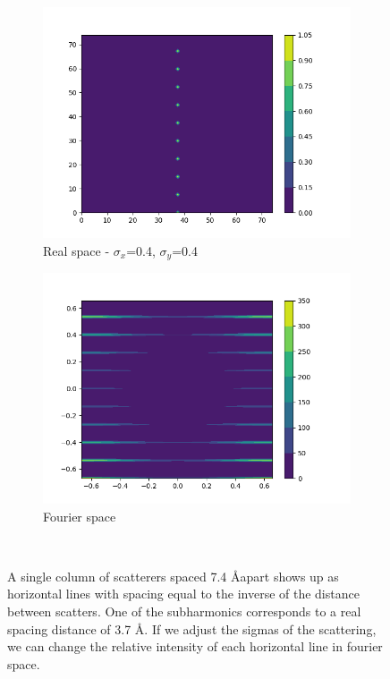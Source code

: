 \documentclass{article}
\begin{document}
\begin{figure}
\begin{subfigure}{0.45\textwidth}
                \includegraphics[width=\textwidth]{real_2d_1column_74_highxysig.png}
                \caption{Real space - $\sigma_x$=0.4, $\sigma_y$=0.4}\label{fig:real_2d_1column_75_highxysig}
        \end{subfigure}
        \begin{subfigure}{0.45\textwidth}
                \centering
                \includegraphics[width=\textwidth]{fourier_2d_1column_74_highxysig.png}
                \caption{Fourier space}\label{fig:fourier_2d_74_1column_highxysig}
        \end{subfigure}

        \caption{A single column of scatterers spaced 7.4 \AA apart shows up as horizontal lines
                 with spacing equal to the inverse of the distance between scatters. One of the
                 subharmonics corresponds to a real spacing distance of 3.7 \AA. If we adjust the 
	         sigmas of the scattering, we can change the relative intensity of each
                 horizontal line in fourier space.}~\label{fig:2d_columns_offset}
\end{figure}

 
\end{document}
